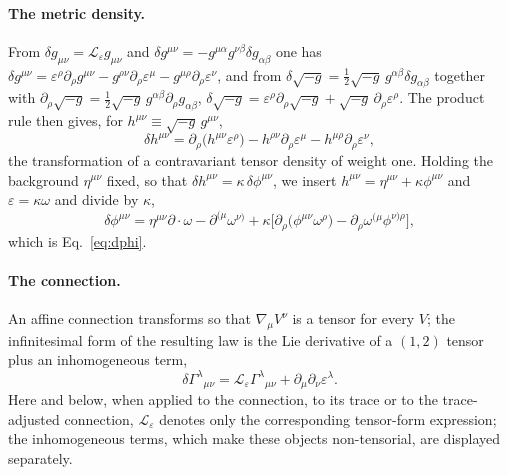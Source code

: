 \documentclass[prd,aps,preprint,superscriptaddress,nofootinbib,amsmath,amssymb,eqsecnum]{revtex4-2}
\begin{document}
\paragraph{The metric density.} From $\delta g_{\mu\nu}=\mathcal{L}_\varepsilon g_{\mu\nu}$
and $\delta g^{\mu\nu}=-g^{\mu\alpha}g^{\nu\beta}\delta g_{\alpha\beta}$ one has
$\delta g^{\mu\nu}=\varepsilon^\rho\partial_\rho g^{\mu\nu}-g^{\rho\nu}\partial_\rho\varepsilon^\mu
-g^{\mu\rho}\partial_\rho\varepsilon^\nu$, and from
$\delta\sqrt{-g}=\tfrac12\sqrt{-g}\,g^{\alpha\beta}\delta g_{\alpha\beta}$ together with
$\partial_\rho\sqrt{-g}=\tfrac12\sqrt{-g}\,g^{\alpha\beta}\partial_\rho g_{\alpha\beta}$,
$\delta\sqrt{-g}=\varepsilon^\rho\partial_\rho\sqrt{-g}+\sqrt{-g}\,\partial_\rho\varepsilon^\rho$.
The product rule then gives, for $h^{\mu\nu}\equiv\sqrt{-g}\,g^{\mu\nu}$,
\begin{equation}
\delta h^{\mu\nu}=\partial_\rho\big(h^{\mu\nu}\varepsilon^\rho\big)
-h^{\rho\nu}\partial_\rho\varepsilon^\mu-h^{\mu\rho}\partial_\rho\varepsilon^\nu ,
\label{eq:dh}
\end{equation}
the transformation of a contravariant tensor density of weight one. Holding the background
$\eta^{\mu\nu}$ fixed, so that $\delta h^{\mu\nu}=\kappa\,\delta\phi^{\mu\nu}$, we insert
$h^{\mu\nu}=\eta^{\mu\nu}+\kappa\phi^{\mu\nu}$ and $\varepsilon=\kappa\omega$ and divide by
$\kappa$,
\begin{equation}
\delta\phi^{\mu\nu}=\eta^{\mu\nu}\partial\!\cdot\!\omega-\partial^{(\mu}\omega^{\nu)}
+\kappa\Big[\partial_\rho\big(\phi^{\mu\nu}\omega^\rho\big)-\partial_\rho\omega^{(\mu}\phi^{\nu)\rho}\Big],
\end{equation}
which is Eq.~\eqref{eq:dphi}.

\paragraph{The connection.} An affine connection transforms so that $\nabla_\mu V^\nu$ is a
tensor for every $V$; the infinitesimal form of the resulting law is the Lie derivative of a
$(1,2)$ tensor plus an inhomogeneous term,
\begin{equation}
\delta\Gamma^{\lambda}{}_{\mu\nu}=\mathcal{L}_\varepsilon\Gamma^{\lambda}{}_{\mu\nu}
+\partial_\mu\partial_\nu\varepsilon^\lambda .
\label{eq:dGamma}
\end{equation}
Here and below, when applied to the connection, to its trace or to the trace-adjusted
connection, $\mathcal{L}_\varepsilon$ denotes only the corresponding tensor-form expression;
the inhomogeneous terms, which make these objects non-tensorial, are displayed separately.
\end{document}
